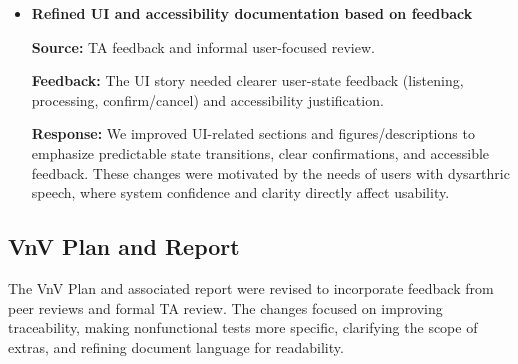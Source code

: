 \documentclass{article}
\begin{document}
\begin{itemize}
\textbf{Source:} Advisor/TA feedback requesting clearer interaction details.

\textbf{Feedback:} The documents needed clearer description of how modules
exchange information and how errors propagate to user-facing feedback.

\textbf{Response:} We expanded the design documentation to describe the
message/data flow at a high level (what data types are passed, where session
state is tracked, and how failures are turned into user-facing feedback and
logs). This made the design more actionable and easier to verify.

\item \textbf{Refined UI and accessibility documentation based on feedback}

\textbf{Source:} TA feedback and informal user-focused review.

\textbf{Feedback:} The UI story needed clearer user-state feedback (listening,
processing, confirm/cancel) and accessibility justification.

\textbf{Response:} We improved UI-related sections and figures/descriptions to
emphasize predictable state transitions, clear confirmations, and accessible
feedback. These changes were motivated by the needs of users with dysarthric
speech, where system confidence and clarity directly affect usability.

\end{itemize}

\subsection{VnV Plan and Report}

The VnV Plan and associated report were revised to incorporate feedback from peer reviews and formal TA review. The changes focused on improving traceability, making nonfunctional tests more specific, clarifying the scope of extras, and refining document language for readability.
\end{document}
